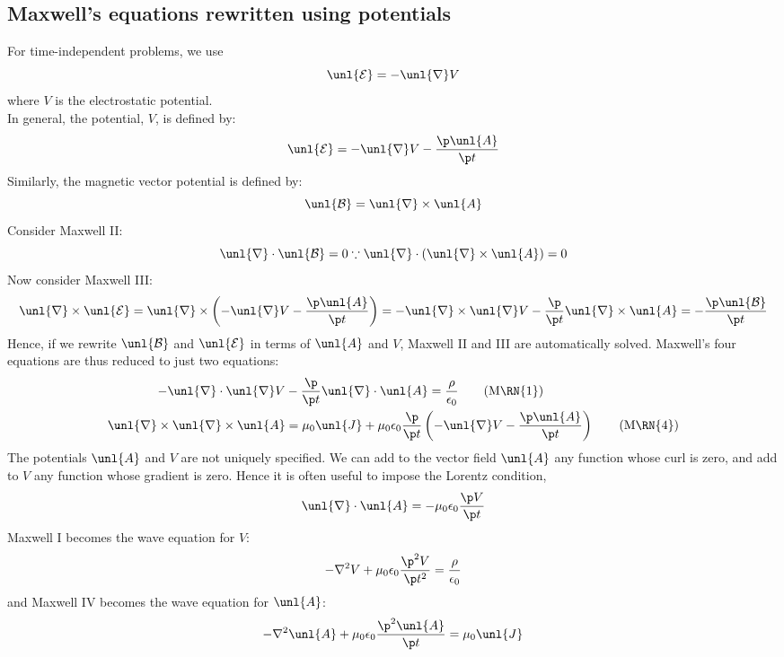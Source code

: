 \documentclass[a4paper, 11pt, normalem]{report}
\renewcommand\E{\mathcal{E}}
\newcommand\uE{\unl{\E}}
\renewcommand\B{\mathcal{B}}
\newcommand\uB{\unl{\B}}
\renewcommand\del{\unl{\nabla}}
\newcommand\eno{\epsilon_0}
\newcommand\J{\unl{J}}
\newcommand\A{\unl{A}}
\begin{document}
\subsection{Maxwell's equations rewritten using potentials}
For time-independent problems, we use
\begin{equation}
	\uE = -\del V
\end{equation}
where $V$ is the electrostatic potential. \\
In general, the potential, $V$, is defined by:
\begin{equation}
	\uE = -\del V - \frac{\p \A}{\p t}
\end{equation}
Similarly, the magnetic vector potential is defined by:
\begin{equation}
	\uB = \del\times\A
\end{equation}
Consider Maxwell \RN{2}:
\begin{equation}
	\del\cdot\uB = 0 \because \del\cdot(\del\times\A) = 0
\end{equation}
Now consider Maxwell \RN{3}:
\begin{equation}
	\del\times\uE = \del\times\left(-\del V - \frac{\p\A}{\p t}\right) = -\del\times\del V - \frac{\p}{\p t}\del\times\A = -\frac{\p \uB}{\p t}
\end{equation}
Hence, if we rewrite $\uB$ and $\uE$ in terms of $\A$ and $V$, Maxwell \RN{2} and \RN{3} are automatically solved.
Maxwell's four equations are thus reduced to just two equations:
\begin{align}
	-\del\cdot\del V &- \frac{\p}{\p t}\del\cdot\A = \frac{\rho}{\eno}  \tag{M\RN{1}} \\
	\del\times\del\times\A &= \mu_0\J + \mu_0\eno\frac{\p}{\p t}\left(-\del V - \frac{\p\A}{\p t}\right) \tag{M\RN{4}}
\end{align}
The potentials $\A$ and $V$ are not uniquely specified.
We can add to the vector field $\A$ any function whose curl is zero, and add to $V$ any function whose gradient is zero.
Hence it is often useful to impose the Lorentz condition,
\begin{equation}
	\del\cdot\A = -\mu_0\eno\frac{\p V}{\p t}
\end{equation}
Maxwell \RN{1} becomes the wave equation for $V$:
\begin{equation}
	-\nabla^2V + \mu_0\eno\frac{\p^2V}{\p t^2} = \frac{\rho}{\eno}
\end{equation}
and Maxwell \RN{4} becomes the wave equation for $\A$:
\begin{equation}
	-\nabla^2\A + \mu_0\eno\frac{\p^2\A}{\p t} = \mu_0\J
\end{equation}
\end{document}
